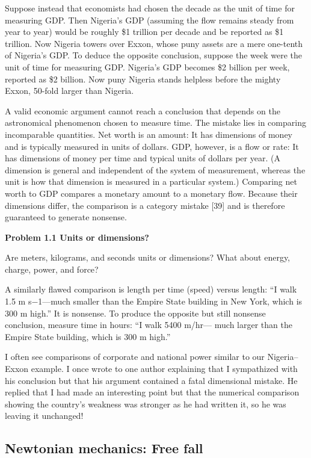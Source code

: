 \documentclass[12pt,a4paper]{article}
\begin{document}
Suppose instead that economists had chosen the decade as the unit of
time for measuring GDP. Then Nigeria’s GDP (assuming the flow remains
steady from year to year) would be roughly \$1 trillion per decade and
be reported as \$1 trillion. Now Nigeria towers over Exxon, whose puny
assets are a mere one-tenth of Nigeria’s GDP. To deduce the opposite
conclusion, suppose the week were the unit of time for measuring GDP.
Nigeria’s GDP becomes \$2 billion per week, reported as \$2 billion. Now
puny Nigeria stands helpless before the mighty Exxon, 50-fold larger than
Nigeria.

A valid economic argument cannot reach a conclusion that depends on
the astronomical phenomenon chosen to measure time. The mistake lies
in comparing incomparable quantities. Net worth is an amount: It has
dimensions of money and is typically measured in units of dollars. GDP,
however, is a flow or rate: It has dimensions of money per time and
typical units of dollars per year. (A dimension is general and independent
of the system of measurement, whereas the unit is how that dimension is
measured in a particular system.) Comparing net worth to GDP compares
a monetary amount to a monetary flow. Because their dimensions differ,
the comparison is a category mistake [39] and is therefore guaranteed to
generate nonsense.

\textbf{Problem 1.1 Units or dimensions?}


Are meters, kilograms, and seconds units or dimensions? What about energy,
charge, power, and force?

A similarly flawed comparison is length per time (speed) versus length:
“I walk 1.5 m s−1—much smaller than the Empire State building in New
York, which is 300 m high.” It is nonsense. To produce the opposite but
still nonsense conclusion, measure time in hours: “I walk 5400 m/hr—
much larger than the Empire State building, which is 300 m high.”

I often see comparisons of corporate and national power similar to our
Nigeria–Exxon example. I once wrote to one author explaining that I
sympathized with his conclusion but that his argument contained a fatal
dimensional mistake. He replied that I had made an interesting point
but that the numerical comparison showing the country’s weakness was
stronger as he had written it, so he was leaving it unchanged!

\begin{center}
\subsection{Newtonian mechanics: Free fall }
\end{center}
\end{document}
